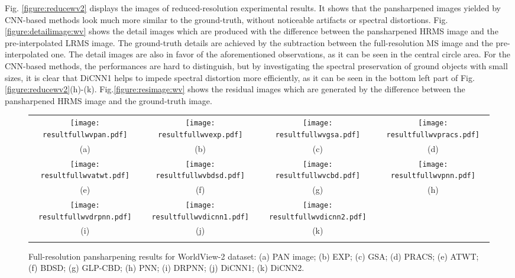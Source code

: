 \documentclass[journal]{IEEEtran}
\begin{document}
Fig. \ref{figure:reducewv2} displays the images of reduced-resolution experimental results. It shows that the pansharpened images yielded by CNN-based methods look much more similar to the ground-truth, without noticeable artifacts or spectral distortions. Fig. \ref{figure:detailimage:wv} shows the detail images which are produced with the difference between the pansharpened HRMS image and the pre-interpolated LRMS image. The ground-truth details are achieved by the subtraction between the full-resolution MS image and the pre-interpolated one. The detail images are also in favor of the aforementioned observations, as it can be seen in the central circle area. For the CNN-based methods, the performances are hard to distinguish, but by investigating the spectral preservation of ground objects with small sizes, it is clear that DiCNN1 helps to impede spectral distortion more efficiently, as it can be seen in the bottom left part of Fig. \ref{figure:reducewv2}(h)-(k). Fig.\ref{figure:resimage:wv} shows the residual images which are generated by the difference between the pansharpened HRMS image and the ground-truth image.

\begin{figure*}[t]\scriptsize
\centering
  \begin{tabular}{cccc}
\texttt{[image: resultfullwvpan.pdf]} &
\texttt{[image: resultfullwvexp.pdf]} &
\texttt{[image: resultfullwvgsa.pdf]} & \texttt{[image: resultfullwvpracs.pdf]} \\
(a) & (b) & (c) & (d) \\
\texttt{[image: resultfullwvatwt.pdf]} &
\texttt{[image: resultfullwvbdsd.pdf]} &
\texttt{[image: resultfullwvcbd.pdf]} &
\texttt{[image: resultfullwvpnn.pdf]} \\
(e) &(f) &(g) &(h) \\
\texttt{[image: resultfullwvdrpnn.pdf]} &
\texttt{[image: resultfullwvdicnn1.pdf]} &
\texttt{[image: resultfullwvdicnn2.pdf]} \\
(i) & (j) & (k)  \\
\\
\end{tabular}
\caption{Full-resolution pansharpening results for WorldView-2 dataset: (a) PAN image; (b) EXP; (c) GSA; (d) PRACS; (e) ATWT; (f) BDSD;  (g) GLP-CBD; (h) PNN; (i) DRPNN; (j) DiCNN1; (k) DiCNN2.}
\label{figure:map:full-wv2}
\end{figure*}
\end{document}

